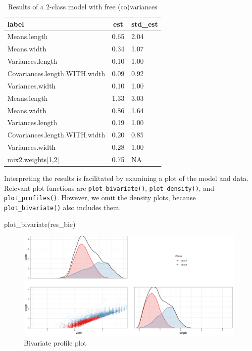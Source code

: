 \documentclass[
  man,floatsintext]{apa6}
\newenvironment{Shaded}{\begin{snugshade}}{\end{snugshade}}
\newcommand{\FunctionTok}[1]{\textcolor[rgb]{0.00,0.00,0.00}{#1}}
\newcommand{\NormalTok}[1]{#1}
\begin{document}
\begin{table}[tbp]

\begin{center}
\begin{threeparttable}

\caption{\label{tab:unnamed-chunk-19}Results of a 2-class model with free (co)variances}

\begin{tabular}{lll}
\toprule
label & \multicolumn{1}{c}{est} & \multicolumn{1}{c}{std\_est}\\
\midrule
Means.length & 0.65 & 2.04\\
Means.width & 0.34 & 1.07\\
Variances.length & 0.10 & 1.00\\
Covariances.length.WITH.width & 0.09 & 0.92\\
Variances.width & 0.10 & 1.00\\
Means.length & 1.33 & 3.03\\
Means.width & 0.86 & 1.64\\
Variances.length & 0.19 & 1.00\\
Covariances.length.WITH.width & 0.20 & 0.85\\
Variances.width & 0.28 & 1.00\\
mix2.weights[1,2] & 0.75 & NA\\
\bottomrule
\end{tabular}

\end{threeparttable}
\end{center}

\end{table}

Interpreting the results is facilitated by examining a plot of the model and data.
Relevant plot functions are \texttt{plot\_bivariate()}, \texttt{plot\_density()}, and \texttt{plot\_profiles()}.
However, we omit the density plots, because \texttt{plot\_bivariate()} also includes them.

\begin{Shaded}
\begin{Highlighting}[]
\FunctionTok{plot\_bivariate}\NormalTok{(res\_bic)}
\end{Highlighting}
\end{Shaded}

\begin{figure}
\includegraphics[width=1\linewidth]{appendices/gmm_bivariate_bic} \caption{Bivariate profile plot}\label{fig:unnamed-chunk-22}
\end{figure}
\end{document}

